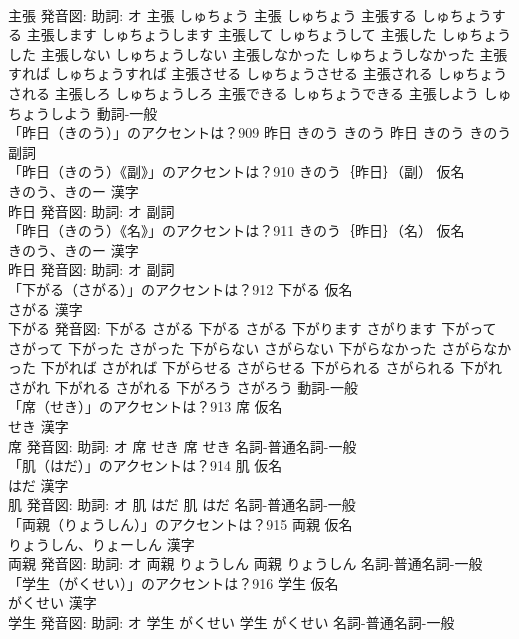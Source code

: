 \documentclass[8pt]{extreport}
\begin{document}
\begin{CJK}{UTF8}{min}
\\	主張 発音図: 助詞: オ	主張 しゅちょう		主張 しゅちょう 主張する しゅちょうする 主張します しゅちょうします 主張して しゅちょうして 主張した しゅちょうした 主張しない しゅちょうしない 主張しなかった しゅちょうしなかった 主張すれば しゅちょうすれば 主張させる しゅちょうさせる 主張される しゅちょうされる 主張しろ しゅちょうしろ 主張できる しゅちょうできる 主張しよう しゅちょうしよう				動詞-一般 
\\	「昨日（きのう）」のアクセントは？909		昨日 きのう きのう		昨日 きのう きのう				副詞 
\\	「昨日（きのう）《副》」のアクセントは？910	きのう｛昨日｝（副） 仮名　
\\	きのう、きのー 漢字　
\\	昨日 発音図: 助詞: オ							副詞 
\\	「昨日（きのう）《名》」のアクセントは？911	きのう｛昨日｝（名） 仮名　
\\	きのう、きのー 漢字　
\\	昨日 発音図: 助詞: オ							副詞 
\\	「下がる（さがる）」のアクセントは？912	下がる 仮名　
\\	さがる 漢字　
\\	下がる 発音図:	下がる さがる		下がる さがる 下がります さがります 下がって さがって 下がった さがった 下がらない さがらない 下がらなかった さがらなかった 下がれば さがれば 下がらせる さがらせる 下がられる さがられる 下がれ さがれ 下がれる さがれる 下がろう さがろう				動詞-一般 
\\	「席（せき）」のアクセントは？913	席 仮名　
\\	せき 漢字　
\\	席 発音図: 助詞: オ	席 せき		席 せき				名詞-普通名詞-一般 
\\	「肌（はだ）」のアクセントは？914	肌 仮名　
\\	はだ 漢字　
\\	肌 発音図: 助詞: オ	肌 はだ		肌 はだ				名詞-普通名詞-一般 
\\	「両親（りょうしん）」のアクセントは？915	両親 仮名　
\\	りょうしん、りょーしん 漢字　
\\	両親 発音図: 助詞: オ	両親 りょうしん		両親 りょうしん				名詞-普通名詞-一般 
\\	「学生（がくせい）」のアクセントは？916	学生 仮名　
\\	がくせい 漢字　
\\	学生 発音図: 助詞: オ	学生 がくせい		学生 がくせい				名詞-普通名詞-一般 

\end{CJK}
\end{document}
